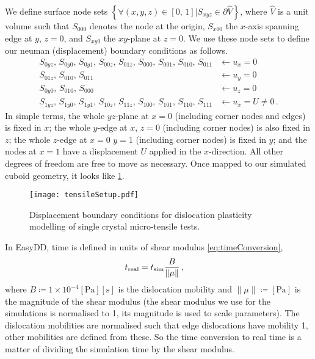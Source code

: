 We define surface node sets $\left\{\forall (x, y, z) \in [0,\, 1] \vert S_{xyz} \in \partial \hat{V}\right\}$, where $\hat{V}$ is a unit volume such that $S_{000}$ denotes the node at the origin, $S_{x00}$ the $x$-axis spanning edge at $y,\, z=0$, and $S_{xy0}$ the $xy$-plane at $z=0$. We use these node sets to define our neuman (displacement) boundary conditions as follows.
\begin{subequations}
    \begin{align}
        S_{0yz},\, S_{0y0},\, S_{0y1},\, S_{00z},\, S_{01z},\, S_{000},\, S_{001},\, S_{010},\, S_{011} & \gets u_x = 0           \\
        S_{01z},\, S_{010},\, S_{011}                                                                   & \gets u_y = 0           \\
        S_{0y0},\, S_{010},\, S_{000}                                                                   & \gets u_z = 0           \\
        S_{1yz},\, S_{1y0},\, S_{1y1},\, S_{10z},\, S_{11z},\, S_{100},\, S_{101},\, S_{110},\, S_{111} & \gets u_x = U \neq 0\,.
    \end{align}
\end{subequations}
In simple terms, the whole $yz$-plane at $x=0$ (including corner nodes and edges) is fixed in $x$; the whole $y$-edge at $x,\,z=0$ (including corner nodes) is also fixed in $z$; the whole $z$-edge at $x = 0\,\, y = 1$ (including corner nodes) is fixed in $y$; and the nodes at $x=1$ have a displacement $U$ applied in the $x$-direction. All other degrees of freedom are free to move as necessary. Once mapped to our simulated cuboid geometry, it looks like \cref{f:tensileSetup}.
\begin{figure}
    \centering
    \texttt{[image: tensileSetup.pdf]}
    \caption[Displacement boundary conditions for dislocation plasticity modelling of single crystal micro-tensile tests.]{Displacement boundary conditions for dislocation plasticity modelling of single crystal micro-tensile tests.}
    \label{f:tensileSetup}
\end{figure}

In EasyDD, time is defined in units of shear modulus \cref{eq:timeConversion},
\begin{align}\label{eq:timeConversion}
    t_{\textrm{real}} & = t_{\textrm{sim}} \dfrac{B}{\lVert\mu\rVert}\,,
\end{align}
where $B \coloneqq 1 \times 10^{-4}[\si{\pascal}][\si{\second}]$ is the dislocation mobility and $\lVert\mu\rVert \coloneqq [\si{\pascal}]$ is the magnitude of the shear modulus (the shear modulus we use for the simulations is normalised to 1, its magnitude is used to scale parameters). The dislocation mobilities are normalised such that edge dislocations have mobility 1, other mobilities are defined from these. So the time conversion to real time is a matter of dividing the simulation time by the shear modulus.

